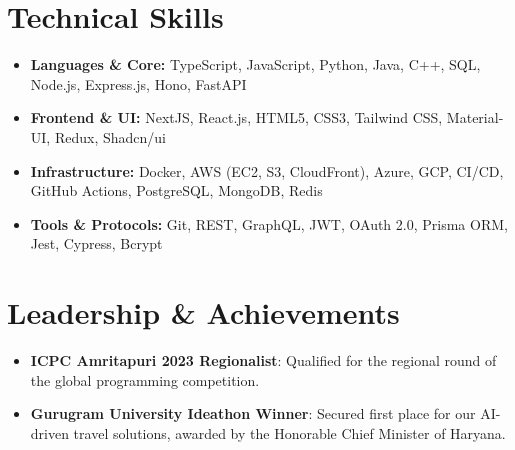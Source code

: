 \documentclass[letterpaper,11pt]{article}
\begin{document}
\section{Technical Skills}
\begin{itemize}[leftmargin=*,itemsep=0pt,parsep=0pt,topsep=0pt,partopsep=0pt]
	\item \textbf{Languages \& Core:} TypeScript, JavaScript, Python, Java, C++, SQL, Node.js, Express.js, Hono, FastAPI
	\item \textbf{Frontend \& UI:} NextJS, React.js, HTML5, CSS3, Tailwind CSS, Material-UI, Redux, Shadcn/ui
	\item \textbf{Infrastructure:} Docker, AWS (EC2, S3, CloudFront), Azure, GCP, CI/CD, GitHub Actions, PostgreSQL, MongoDB, Redis
	\item \textbf{Tools \& Protocols:} Git, REST, GraphQL, JWT, OAuth 2.0, Prisma ORM, Jest, Cypress, Bcrypt
\end{itemize}
\vspace{-6pt}

\section{Leadership \& Achievements}
\begin{itemize}[leftmargin=*,itemsep=0pt,parsep=0pt,topsep=0pt,partopsep=0pt]
	\item \textbf{ICPC Amritapuri 2023 Regionalist}: Qualified for the regional round of the global programming competition.
	\item \textbf{Gurugram University Ideathon Winner}: Secured first place for our AI-driven travel solutions, awarded by the Honorable Chief Minister of Haryana.
\end{itemize}
\end{document}
